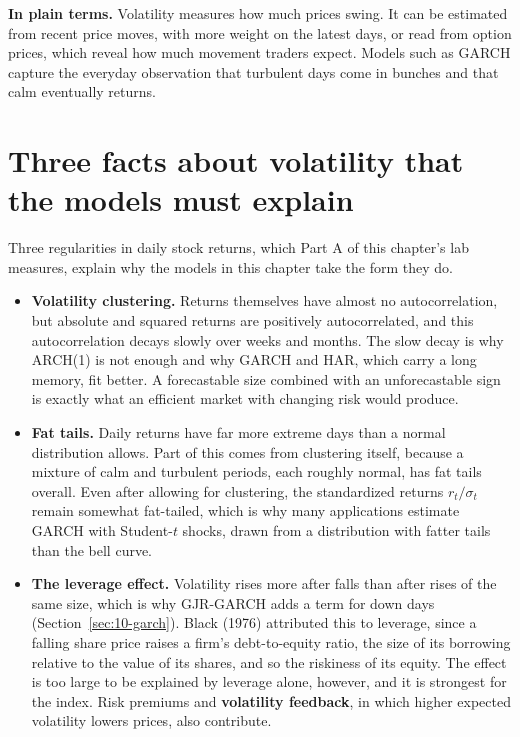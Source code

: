 \noindent\textbf{In plain terms.} Volatility measures how much prices swing. It can be estimated from recent price moves, with more weight on the latest days, or read from option prices, which reveal how much movement traders expect. Models such as GARCH capture the everyday observation that turbulent days come in bunches and that calm eventually returns.


\section[Three facts about volatility]{Three facts about volatility that the models must explain}
\label{sec:10-how}

Three regularities in daily stock returns, which Part A of this chapter's lab measures, explain why the models in this chapter take the form they do.

\begin{itemize}
  \item \textbf{Volatility clustering.} Returns themselves have almost no autocorrelation, but absolute and squared returns are positively autocorrelated, and this autocorrelation decays slowly over weeks and months. The slow decay is why ARCH(1) is not enough and why GARCH and HAR, which carry a long memory, fit better. A forecastable size combined with an unforecastable sign is exactly what an efficient market with changing risk would produce.
  \item \textbf{Fat tails.} Daily returns have far more extreme days than a normal distribution allows. Part of this comes from clustering itself, because a mixture of calm and turbulent periods, each roughly normal, has fat tails overall. Even after allowing for clustering, the standardized returns $r_t / \sigma_t$ remain somewhat fat-tailed, which is why many applications estimate GARCH with Student-$t$ shocks, drawn from a distribution with fatter tails than the bell curve.
  \item \textbf{The leverage effect.} Volatility rises more after falls than after rises of the same size, which is why GJR-GARCH adds a term for down days (Section~\ref{sec:10-garch}). Black (1976) attributed this to leverage, since a falling share price raises a firm's debt-to-equity ratio, the size of its borrowing relative to the value of its shares, and so the riskiness of its equity. The effect is too large to be explained by leverage alone, however, and it is strongest for the index. Risk premiums and \textbf{volatility feedback}, in which higher expected volatility lowers prices, also contribute.
\end{itemize}

